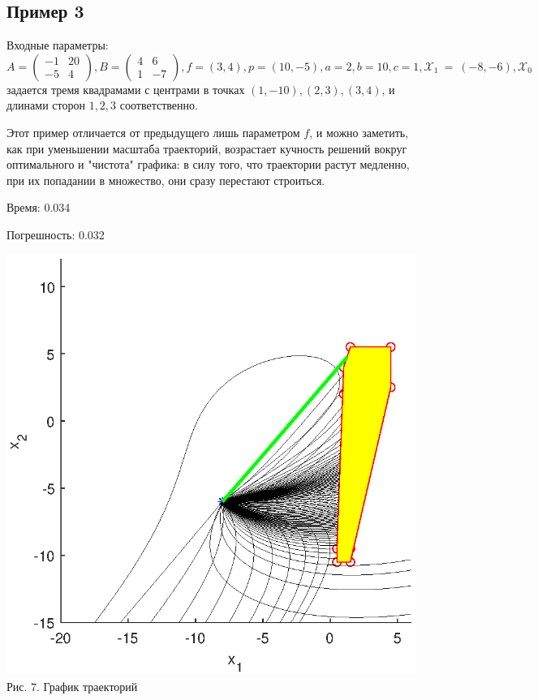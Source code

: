 \documentclass{article}
\theoremstyle{definition}
\begin{document}
\newpage

\subsection{Пример 3}

Входные параметры: $A = \begin{pmatrix} -1 & 20 \\ -5 & 4\end{pmatrix}, B = \begin{pmatrix} 4 & 6 \\ 1 & -7\end{pmatrix}, 
f = (3, 4), p = (10,-5), a = 2, b = 10, c = 1, \mathcal{X}_1~=~(-8,-6), \mathcal{X}_0$
 задается тремя квадрамами с центрами в точках $(1, -10), (2,3), (3,4)$,
и длинами сторон $1, 2, 3$ соответственно.

Этот пример отличается от предыдущего лишь параметром $f$, и можно заметить, как при уменьшении масштаба траекторий, возрастает
кучность решений вокруг оптимального и "чистота" графика: в силу того, что траектории растут медленно, при их попадании в 
множество, они сразу перестают строиться.

Время: 0.034

Погрешность: 0.032

\begin{center}
{\includegraphics[width=15cm]{example3.eps}}
{Рис. 7. График траекторий}
\end{center}
\end{document}
